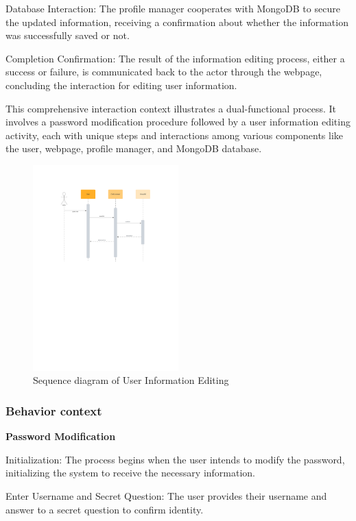 \documentclass[conference]{IEEEtran}
\begin{document}
Database Interaction: The profile manager cooperates with MongoDB to secure the updated information, receiving a confirmation about whether the information was successfully saved or not.

Completion Confirmation: The result of the information editing process, either a success or failure, is communicated back to the actor through the webpage, concluding the interaction for editing user information.

This comprehensive interaction context illustrates a dual-functional process. It involves a password modification procedure followed by a user information editing activity, each with unique steps and interactions among various components like the user, webpage, profile manager, and MongoDB database.
\begin{figure}[htbp]
	\centerline{\includegraphics[width=0.5\textwidth]{Diagram_of_Editing_Info_and_Password/Sequence_diagram_of_editing_info.pdf}}
	\caption{Sequence diagram of User Information Editing }
	\label{Sequence_diagram_of_editing_info}
\end{figure}
\subsubsection{\textbf{Behavior context }}
\textbf{ }

\textbf{ Password Modification}

Initialization: The process begins when the user intends to modify the password, initializing the system to receive the necessary information.

Enter Username and Secret Question: The user provides their username and answer to a secret question to confirm identity.
\end{document}
